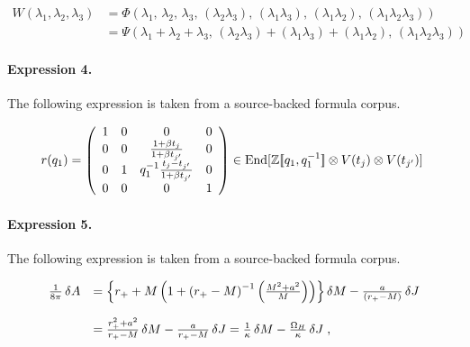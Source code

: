 \documentclass[11pt]{article}
\begin{document}
\begin{align*}W(\lambda_1,\lambda_2,\lambda_3) &= \Phi(\lambda_1,\,\lambda_2,\,\lambda_3,\,(\lambda_2\lambda_3),\,(\lambda_1\lambda_3),\,(\lambda_1\lambda_2),\,(\lambda_1\lambda_2\lambda_3))\\&= \Psi(\lambda_1+\lambda_2+\lambda_3,\,(\lambda_2\lambda_3)+(\lambda_1\lambda_3)+(\lambda_1\lambda_2),\,(\lambda_1\lambda_2\lambda_3))\end{align*}

\paragraph{Expression 4.} The following expression is taken from a source-backed formula corpus.

\begin{align*}r(q_1)=\left( \begin{array}{cccc}1 & 0 & 0 & 0 \\ 0 & 0 & \frac{1+\beta t_{j}}{1+\beta t_{j^{\prime }}} & 0 \\ 0 & 1 & q_1^{-1}\frac{t_{j}-t_{j^{\prime }}}{1+\beta t_{j^{\prime }}} & 0 \\ 0 & 0 & 0 & 1\end{array}\right)\in\operatorname{End}[\mathbb{Z}[\![q_1,q_{1}^{-1}]\!]\otimes V(t_j)\otimes V(t_{j\rq{}})] \; \end{align*}

\paragraph{Expression 5.} The following expression is taken from a source-backed formula corpus.

\begin{align*}\begin{array}{ll}{1\over8\pi}\,\delta A&=\left\{r_++M\left(1+{\left(r_+-M\right)}^{-1}\left(M^2+a^2\over M\right)\right)\right\}\delta M-\frac{a}{\left(r_+-M\right)}\,\delta J\\\\&=\frac{r_+^2+a^2}{r_+-M}\,\delta M-\frac{a}{r_+-M}\,\delta J={1\over\kappa}\,\delta M-\frac{\Omega_H}{\kappa}\,\delta J\;,\end{array}\end{align*}
\end{document}
